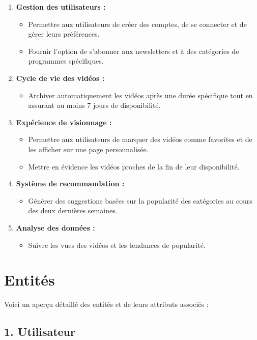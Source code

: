 \documentclass[a4paper, 12pt]{article}
\begin{document}
\begin{enumerate}
    \item \textbf{Gestion des utilisateurs :}
    \begin{itemize}
        \item Permettre aux utilisateurs de créer des comptes, de se connecter et de gérer leurs préférences.
        \item Fournir l'option de s'abonner aux newsletters et à des catégories de programmes spécifiques.
    \end{itemize}
    \item \textbf{Cycle de vie des vidéos :}
    \begin{itemize}
        \item Archiver automatiquement les vidéos après une durée spécifique tout en assurant au moins 7 jours de disponibilité.
    \end{itemize}
    \item \textbf{Expérience de visionnage :}
    \begin{itemize}
        \item Permettre aux utilisateurs de marquer des vidéos comme favorites et de les afficher sur une page personnalisée.
        \item Mettre en évidence les vidéos proches de la fin de leur disponibilité.
    \end{itemize}
    \item \textbf{Système de recommandation :}
    \begin{itemize}
        \item Générer des suggestions basées sur la popularité des catégories au cours des deux dernières semaines.
    \end{itemize}
    \item \textbf{Analyse des données :}
    \begin{itemize}
        \item Suivre les vues des vidéos et les tendances de popularité.
    \end{itemize}
\end{enumerate}

\section*{Entités}

Voici un aperçu détaillé des entités et de leurs attributs associés :

\subsection*{1. Utilisateur}
\end{document}
